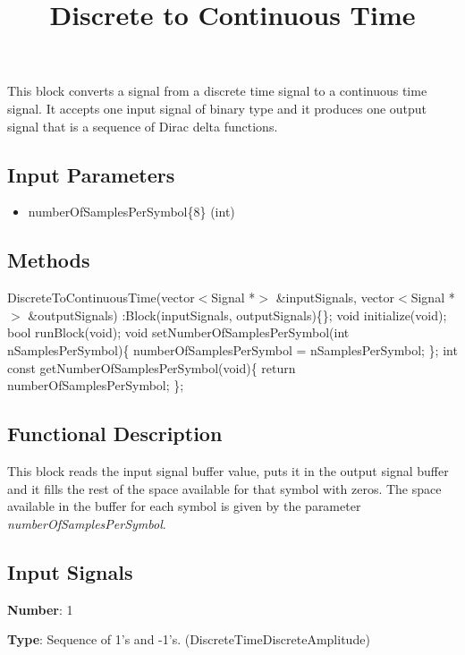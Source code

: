 \documentclass[a4paper]{article}
\title{Discrete to Continuous Time}
\begin{document}
\maketitle

This block converts a signal from a discrete time signal to a continuous time signal. It accepts one input signal of binary type and it produces one output signal that is a sequence of Dirac delta functions.

\subsection*{Input Parameters}

\begin{itemize}
	\item numberOfSamplesPerSymbol\{8\} \linebreak
	(int)
\end{itemize}

\subsection*{Methods}

DiscreteToContinuousTime(vector$<$Signal *$>$ \&inputSignals, vector$<$Signal *$>$ \&outputSignals) :Block(inputSignals, outputSignals)\{\};
\bigbreak	
void initialize(void);
\bigbreak	
bool runBlock(void);
\bigbreak	
void setNumberOfSamplesPerSymbol(int nSamplesPerSymbol)\{ numberOfSamplesPerSymbol = nSamplesPerSymbol; \};
\bigbreak
int const getNumberOfSamplesPerSymbol(void)\{ return numberOfSamplesPerSymbol; \};

\subsection*{Functional Description}

This block reads the input signal buffer value, puts it in the output signal buffer and it fills the rest of the space available for that symbol with zeros. The space available in the buffer for each symbol is given by the parameter \textit{numberOfSamplesPerSymbol}.

\subsection*{Input Signals}

\textbf{Number}: 1

\textbf{Type}: Sequence of 1's and -1's. (DiscreteTimeDiscreteAmplitude)
\end{document}

